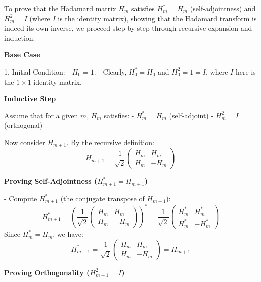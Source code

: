 \documentclass[8pt]{article}
\begin{document}
To prove that the Hadamard matrix \(H_m\) satisfies \(H_m^* = H_m\) (self-adjointness) and \(H_m^2 = I\) (where \(I\) is the identity matrix), showing that the Hadamard transform is indeed its own inverse, we proceed step by step through recursive expansion and induction.

\textbf{Base Case}

1. Initial Condition: 
   - \(H_0 = 1\). 
   - Clearly, \(H_0^* = H_0\) and \(H_0^2 = 1 = I\), where \(I\) here is the \(1 \times 1\) identity matrix.

\textbf{Inductive Step}

Assume that for a given \(m\), \(H_m\) satisfies:
- \(H_m^* = H_m\) (self-adjoint)
- \(H_m^2 = I\) (orthogonal)

Now consider \(H_{m+1}\). By the recursive definition:
\[
H_{m+1} = \frac{1}{\sqrt{2}} \begin{pmatrix} H_m & H_m \\ H_m & -H_m \end{pmatrix}
\]

\textbf{Proving Self-Adjointness (\(H_{m+1}^* = H_{m+1}\))}

- Compute \(H_{m+1}^*\) (the conjugate transpose of \(H_{m+1}\)):
  \[
  H_{m+1}^* = \left(\frac{1}{\sqrt{2}} \begin{pmatrix} H_m & H_m \\ H_m & -H_m \end{pmatrix}\right)^* = \frac{1}{\sqrt{2}} \begin{pmatrix} H_m^* & H_m^* \\ H_m^* & -H_m^* \end{pmatrix}
  \]
  Since \(H_m^* = H_m\), we have:
  \[
  H_{m+1}^* = \frac{1}{\sqrt{2}} \begin{pmatrix} H_m & H_m \\ H_m & -H_m \end{pmatrix} = H_{m+1}
  \]

\textbf{Proving Orthogonality (\(H_{m+1}^2 = I\))}
\end{document}
